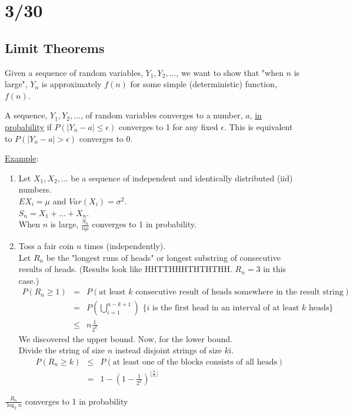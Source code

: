 \section*{3/30}
  \subsection*{Limit Theorems}
    Given a sequence of random variables, $Y_1, Y_2, \ldots$,
    we want to show that "when $n$ is large", $Y_n$ is approximately $f(n)$ for 
    some simple (deterministic) function, $f(n)$.
    \begin{definition}
      A sequence, $Y_1, Y_2, \ldots$, of random variables converges to a number,
      $a$, \underline{in probability} if $P(|Y_n - a| \le \epsilon)$ converges
      to 1 for any fixed $\epsilon$. This is equivalent to $P(|Y_n - a| > 
      \epsilon)$ converges to 0.
    \end{definition}
    \underline{Example}:\\
      \begin{enumerate}
        \item Let $X_1, X_2, \ldots$ be a sequence of independent and identically
          distributed (iid) numbers.\\
          $EX_i = \mu$ and $Var(X_i) = \sigma^2$.\\
          $S_n = X_1 + \ldots + X_n$.\\
          When $n$ is large, $\frac{S_n}{n\mu}$ converges to 1 in probability.
        \item Toss a fair coin $n$ times (independently).\\
          Let $R_n$ be the "longest runs of heads" or longest substring of 
          consecutive results of heads. (Results look like HHTTHHHTHTHTHH. 
          $R_n = 3$ in this case.)\\
          \begin{eqnarray*}
            P(R_n \ge 1) & = & P(\text{at least $k$ consecutive result of heads
              somewhere in the result string})\\
            & = & P(\bigcup_{i = 1}^{n - k + 1}) \text{ \{$i$ is the first head in an
              interval of at least $k$ heads\}}\\
            & \le & n \frac{1}{2^k} 
          \end{eqnarray*}
          We discovered the upper bound. Now, for the lower bound.\\
          Divide the string of size $n$ instead disjoint strings of size $k$i.
          \begin{eqnarray*}
            P(R_n \ge k) & \le & P(\text{at least one of the blocks consists of
              all heads})\\
              & = & 1 - (1 - \frac{1}{2^k})^{\lfloor\frac{n}{k}\rfloor}
          \end{eqnarray*}
      \end{enumerate}
      \begin{theorem}
        $\frac{R_n}{\log_2n}$ converges to 1 in probability
      \end{theorem}
